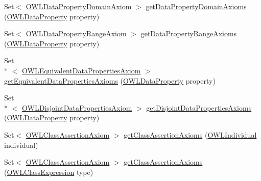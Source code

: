 \begin{DoxyCompactItemize}
\item 
Set$<$ \hyperlink{interfaceorg_1_1semanticweb_1_1owlapi_1_1model_1_1_o_w_l_data_property_domain_axiom}{O\-W\-L\-Data\-Property\-Domain\-Axiom} $>$ \hyperlink{classuk_1_1ac_1_1manchester_1_1cs_1_1owl_1_1owlapi_1_1_o_w_l_ontology_impl_ae8f3f0c8bc2f0e779ff3f960eb93efb9}{get\-Data\-Property\-Domain\-Axioms} (\hyperlink{interfaceorg_1_1semanticweb_1_1owlapi_1_1model_1_1_o_w_l_data_property}{O\-W\-L\-Data\-Property} property)
\item 
Set$<$ \hyperlink{interfaceorg_1_1semanticweb_1_1owlapi_1_1model_1_1_o_w_l_data_property_range_axiom}{O\-W\-L\-Data\-Property\-Range\-Axiom} $>$ \hyperlink{classuk_1_1ac_1_1manchester_1_1cs_1_1owl_1_1owlapi_1_1_o_w_l_ontology_impl_abdc9d382eaab70c82e94a3d4c29df799}{get\-Data\-Property\-Range\-Axioms} (\hyperlink{interfaceorg_1_1semanticweb_1_1owlapi_1_1model_1_1_o_w_l_data_property}{O\-W\-L\-Data\-Property} property)
\item 
Set\\*
$<$ \hyperlink{interfaceorg_1_1semanticweb_1_1owlapi_1_1model_1_1_o_w_l_equivalent_data_properties_axiom}{O\-W\-L\-Equivalent\-Data\-Properties\-Axiom} $>$ \hyperlink{classuk_1_1ac_1_1manchester_1_1cs_1_1owl_1_1owlapi_1_1_o_w_l_ontology_impl_aa71a257f34192492e5157e894c682784}{get\-Equivalent\-Data\-Properties\-Axioms} (\hyperlink{interfaceorg_1_1semanticweb_1_1owlapi_1_1model_1_1_o_w_l_data_property}{O\-W\-L\-Data\-Property} property)
\item 
Set\\*
$<$ \hyperlink{interfaceorg_1_1semanticweb_1_1owlapi_1_1model_1_1_o_w_l_disjoint_data_properties_axiom}{O\-W\-L\-Disjoint\-Data\-Properties\-Axiom} $>$ \hyperlink{classuk_1_1ac_1_1manchester_1_1cs_1_1owl_1_1owlapi_1_1_o_w_l_ontology_impl_af33447c730ec6b659b03056328549f68}{get\-Disjoint\-Data\-Properties\-Axioms} (\hyperlink{interfaceorg_1_1semanticweb_1_1owlapi_1_1model_1_1_o_w_l_data_property}{O\-W\-L\-Data\-Property} property)
\item 
Set$<$ \hyperlink{interfaceorg_1_1semanticweb_1_1owlapi_1_1model_1_1_o_w_l_class_assertion_axiom}{O\-W\-L\-Class\-Assertion\-Axiom} $>$ \hyperlink{classuk_1_1ac_1_1manchester_1_1cs_1_1owl_1_1owlapi_1_1_o_w_l_ontology_impl_a9144803671dac3b7d3b05512264c96bf}{get\-Class\-Assertion\-Axioms} (\hyperlink{interfaceorg_1_1semanticweb_1_1owlapi_1_1model_1_1_o_w_l_individual}{O\-W\-L\-Individual} individual)
\item 
Set$<$ \hyperlink{interfaceorg_1_1semanticweb_1_1owlapi_1_1model_1_1_o_w_l_class_assertion_axiom}{O\-W\-L\-Class\-Assertion\-Axiom} $>$ \hyperlink{classuk_1_1ac_1_1manchester_1_1cs_1_1owl_1_1owlapi_1_1_o_w_l_ontology_impl_a5f260d2d63f3785cc430ad27e0e949b8}{get\-Class\-Assertion\-Axioms} (\hyperlink{interfaceorg_1_1semanticweb_1_1owlapi_1_1model_1_1_o_w_l_class_expression}{O\-W\-L\-Class\-Expression} type)

\end{DoxyCompactItemize}
